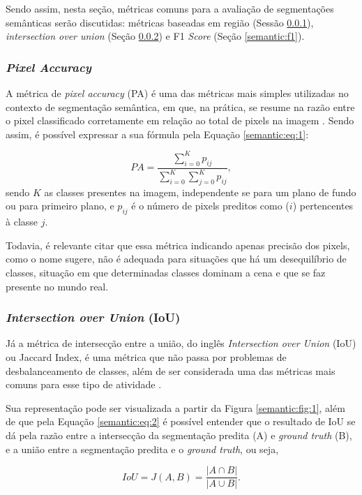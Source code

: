 Sendo assim, nesta seção, métricas comuns para a avaliação de segmentações semânticas serão discutidas: métricas baseadas em região (Sessão \ref{semantic:pa}), \textit{intersection over union} (Seção \ref{semantic:IoU}) e F1 \textit{Score} (Seção \ref{semantic:f1}).


\subsubsection{\textit{Pixel Accuracy}}
\label{semantic:pa}
A métrica de \textit{pixel accuracy} (PA) é uma das métricas mais simples utilizadas no contexto de segmentação semântica, em que, na prática, se resume na razão entre o pixel classificado corretamente em relação ao total de pixels na imagem \citep{Minaee2021}. Sendo assim, é possível expressar a sua fórmula pela Equação \ref{semantic:eq:1}:

\begin{equation}
    \label{semantic:eq:1}
    PA = \frac{\sum_{i=0}^{K} p_{ij}}{\sum_{i=0}^{K} \sum_{j=0}^{K} p_{ij}},
\end{equation}
sendo $K$ as classes presentes na imagem, independente se para um plano de fundo ou para primeiro plano, e $p_{ij}$ é o número de pixels preditos como ($i$) pertencentes à classe $j$.

Todavia, é relevante citar que essa métrica indicando apenas precisão dos pixels, como o nome sugere, não é adequada para situações que há um desequilíbrio de classes, situação em que determinadas classes dominam a cena e que se faz presente no mundo real.


\subsubsection{\textit{Intersection over Union} (IoU)}
\label{semantic:IoU}
Já a métrica de intersecção entre a união, do inglês \textit{Intersection over Union} (IoU) ou Jaccard Index, é uma métrica que não passa por problemas de desbalanceamento de classes, além de ser considerada uma das métricas mais comuns para esse tipo de atividade \cite{Minaee2021}.

Sua representação pode ser visualizada a partir da Figura \ref{semantic:fig:1}, além de que pela Equação \ref{semantic:eq:2} é possível entender que o resultado de IoU se dá pela razão entre a intersecção da segmentação predita (A) e \textit{ground truth} (B), e a união entre a segmentação predita e o \textit{ground truth}, ou seja,

\begin{equation}
    \label{semantic:eq:2}
    IoU = J(A,B) = \frac{|A \cap B|}{|A \cup B|}.
\end{equation}

